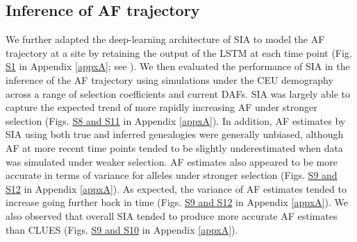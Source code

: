 \subsection{Inference of \ac{AF} trajectory}
We further adapted the deep-learning architecture of \ac{SIA} to model the \ac{AF} trajectory at a site by retaining the output of the \ac{LSTM} at each time point (Fig. \href{https://academic.oup.com/mbe/article/39/1/msab332/6433161?login=true#supplementary-data}{S1} in Appendix \ref{appxA}; see ). We then evaluated the performance of \ac{SIA} in the inference of the \ac{AF} trajectory using simulations under the CEU demography across a range of selection coefficients and current \acp{DAF}. \ac{SIA} was largely able to capture the expected trend of more rapidly increasing \ac{AF} under stronger selection (Figs. \href{https://academic.oup.com/mbe/article/39/1/msab332/6433161?login=true#supplementary-data}{S8 and S11} in Appendix \ref{appxA}). In addition, \ac{AF} estimates by \ac{SIA} using both true and inferred genealogies were generally unbiased, although \ac{AF} at more recent time points tended to be slightly underestimated when data was simulated under weaker selection. \ac{AF} estimates also appeared to be more accurate in terms of variance for alleles under stronger selection (Figs. \href{https://academic.oup.com/mbe/article/39/1/msab332/6433161?login=true#supplementary-data}{S9 and S12} in Appendix \ref{appxA}). As expected, the variance of \ac{AF} estimates tended to increase going further back in time (Figs. \href{https://academic.oup.com/mbe/article/39/1/msab332/6433161?login=true#supplementary-data}{S9 and S12} in Appendix \ref{appxA}). We also observed that overall \ac{SIA} tended to produce more accurate \ac{AF} estimates than CLUES (Figs. \href{https://academic.oup.com/mbe/article/39/1/msab332/6433161?login=true#supplementary-data}{S9 and S10} in Appendix \ref{appxA}).

